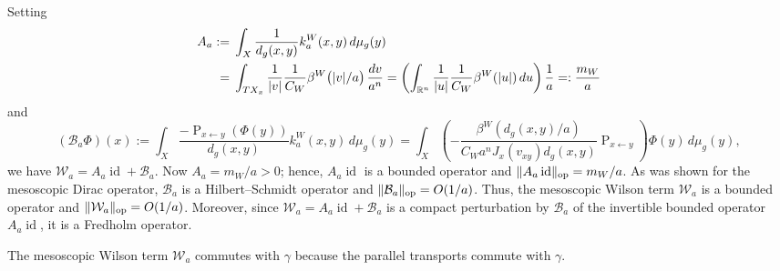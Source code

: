 \documentclass[a4paper,oneside,12pt]{amsart}
\theoremstyle{plain}
\theoremstyle{definition}
\theoremstyle{remark}
\newcommand{\R}{\mathbb{R}}
\DeclarePairedDelimiter{\abs}{\lvert}{\rvert}
\DeclareMathOperator{\id}{id}
\newcommand{\dvol}{d\mu}
\newcommand{\paralleltransport}[2]{\operatorname{P}_{#2 \gets #1}}
\DeclarePairedDelimiter{\operatornorm}{\lVert}{\rVert_{\mathrm{op}}}
\newcommand{\mesoscopicWilsonterm}[1][a]{\mathcal{W}_{#1}}
\newcommand{\cutoff}{\beta}
\newcommand{\cutoffWilson}{\cutoff^W}
\newcommand{\mesoscopicWilsontermcompactpert}[1][a]{\mathcal{B}_{#1}}
\newcommand{\integralkernel}{k}
\newcommand{\kernelWilson}{\integralkernel_a^W}
\begin{document}
Setting
\begin{equation}
  \begin{aligned}
  A_a :={}& \int_X \frac{1}{d_g(x,y)} \kernelWilson(x,y) \,\dvol_g(y) \\
  ={}& \int_{TX_x} \frac{1}{\abs{v}} \frac{1}{C_W} \cutoffWilson\big(\abs{v}/a\big) \,\frac{dv}{a^n} = \left( \int_{\R^n} \frac{1}{\abs{u}} \frac{1}{C_W} \cutoffWilson(\abs{u}) \,du \right) \frac{1}{a} =: \frac{m_W}{a}
  \end{aligned}
\end{equation}
and
\begin{equation}
  (\mesoscopicWilsontermcompactpert \Phi)(x) := \int_X \frac{-\paralleltransport{y}{x}(\Phi(y))}{d_g(x,y)} \kernelWilson(x,y) \,\dvol_g(y) = \int_X \left(-\frac{\cutoffWilson(d_g(x,y)/a)}{C_W a^n J_x(v_{xy}) d_g(x,y)} \paralleltransport{y}{x} \right) \Phi(y) \,\dvol_g(y),
\end{equation}
we have $\mesoscopicWilsonterm = A_a \id + \mesoscopicWilsontermcompactpert$.
Now $A_a = m_W/a > 0$; hence, $A_a \id$ is a bounded operator and $\operatornorm{A_a \id} = m_W/a$.
As was shown for the mesoscopic Dirac operator, $\mesoscopicWilsontermcompactpert$ is a Hilbert--Schmidt operator and $\operatornorm{\mesoscopicWilsontermcompactpert} = O(1/a)$.
Thus, the mesoscopic Wilson term $\mesoscopicWilsonterm$ is a bounded operator and $\operatornorm{\mesoscopicWilsonterm} = O(1/a)$.
Moreover, since $\mesoscopicWilsonterm = A_a \id + \mesoscopicWilsontermcompactpert$ is a compact perturbation by $\mesoscopicWilsontermcompactpert$ of the invertible bounded operator $A_a \id$, it is a Fredholm operator.

The mesoscopic Wilson term $\mesoscopicWilsonterm$ commutes with $\gamma$ because the parallel transports commute with $\gamma$.
\end{document}

